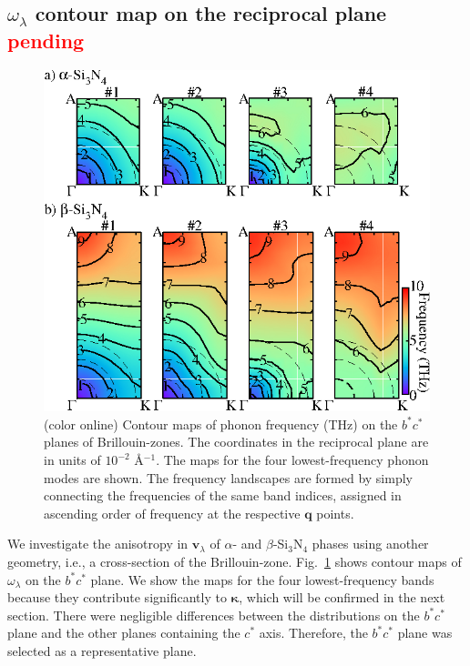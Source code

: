 \documentclass[twocolumn,amsmath,amssymb,a4paper,prb,superscriptaddress,floatfix]{revtex4-1}
\begin{document}
\subsection{$\omega_\lambda$ contour map on the reciprocal plane \textcolor{red}{pending}}

\begin{figure}[ht]
 \centerins
  \includegraphics[width=\linewidth]{Fig2_small_scale.eps} \caption{(color
  online) Contour maps of phonon frequency (THz) on the $b^*c^*$
  planes of Brillouin-zones. The coordinates in the reciprocal plane 
   are in units of $10^{-2}$ \AA$^{-1}$. The maps for the four lowest-frequency
  phonon modes are shown. The frequency landscapes are formed by simply
  connecting the frequencies of the same band indices, assigned in
  ascending order of frequency at the respective $\mathbf {q}$
  points. \label{fig:Fig3_338} }
 \centering
\end{figure}

We investigate the anisotropy in $\mathbf{v}_{\lambda}$ of $\alpha$- and
$\beta$-Si$_3$N$_4$ phases using another geometry, i.e., a cross-section of the
Brillouin-zone. Fig.~\ref{fig:Fig3_338} shows contour maps of
$\omega_{\lambda}$  on the $b^*c^*$ plane.  We show the maps for the four
lowest-frequency bands because they contribute significantly to
$\boldsymbol{\kappa}$, which will be confirmed in the next section. There were
negligible differences between the distributions on the $b^*c^*$ plane and the
other planes containing the $c^*$ axis.  Therefore, the $b^*c^*$ plane was
selected as a representative plane.  
\end{document}
